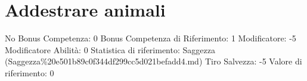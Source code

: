 \section{Addestrare animali}\label{addestrare-animali}

\begin{description}
\tightlist
\item[Tags: ABI]
No Bonus Competenza: 0 Bonus Competenza di Riferimento: 1 Modificatore:
-5 Modificatore Abilità: 0 Statistica di riferimento: Saggezza
(Saggezza\%20e501b89c0f344df299cc5d021befadd4.md) Tiro Salvezza: -5
Valore di riferimento: 0
\end{description}
